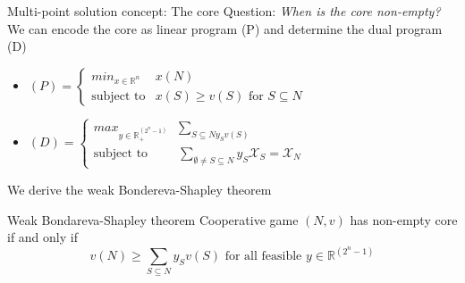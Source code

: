 \documentclass{beamer}
\newcommand{\R}{\mathbb{R}}
\begin{document}


\begin{frame}{Multi-point solution concept: The core}
    Question: \textit{When is the core non-empty?} \\ 
	We can encode the core as linear program (P) and determine the dual program (D)
    \begin{itemize}
		\item $\left(P\right)=\begin{cases}
			min_{x \in \R^n} & x \left(N\right) \\
			\text{subject to} &x\left(S\right) \geq v\left(S\right)\text{ for }S \subseteq N
		\end{cases}$
		\item $\left(D\right)=\begin{cases}
			max_{y \in \R_{+}^{\left(2^n-1\right)}} & \sum_{S \subseteq N y_S v\left(S\right)} \\
			\text{subject to} & \sum_{\emptyset \neq S \subseteq N} y_S \mathcal{X}_S = \mathcal{X}_N
		\end{cases}$
	\end{itemize}
	We derive the weak Bondereva-Shapley theorem
	\begin{block}{Weak Bondareva-Shapley theorem}
		Cooperative game $\left(N,v\right)$ has non-empty core if and only if 
		\[
			v\left(N\right) \geq \sum_{S \subseteq N} y_S v\left(S\right)\text{ for all feasible }y \in \R^{\left(2^n-1\right)}
		\]
	\end{block}
\end{frame}


\end{document}
